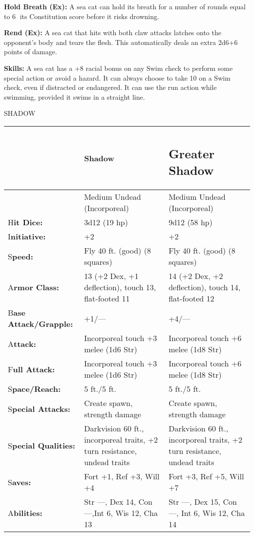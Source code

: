 \documentclass{article}
\begin{document}
\textbf{Hold Breath (Ex): }A sea cat can hold its breath for a number of rounds 
equal to 6 $ $its Constitution score before it risks drowning. 

\textbf{Rend (Ex): }A sea cat that hits with both claw attacks latches onto the 
opponent's body and tears the flesh. This automatically deals an extra 2d6+6 points 
of damage.

\textbf{Skills:} A sea cat has a +8 racial bonus on any Swim check to perform some 
special action or avoid a hazard. It can always choose to take 10 on a Swim check, 
even if distracted or endangered. It can use the run action while swimming, provided 
it swims in a straight line.

\vspace{12pt}
{\LARGE{}SHADOW}

\begin{tabular}{|>{\raggedright}p{47pt}|>{\raggedright}p{135pt}|>{\raggedright}p{132pt}|}
\hline
 & S\textbf{hadow} & \subsection*{G\textbf{reater Shadow}}\tabularnewline
\hline
 & Medium Undead (Incorporeal) & Medium Undead (Incorporeal)\tabularnewline
\hline
H\textbf{it Dice:} & 3d12 (19 hp) & 9d12 (58 hp)\tabularnewline
\hline
I\textbf{nitiative:} & +2 & +2\tabularnewline
\hline
S\textbf{peed:} & Fly 40 ft. (good) (8 squares) & Fly 40 ft. (good) (8 squares)\tabularnewline
\hline
A\textbf{rmor Class:} & 13 (+2 Dex, +1 deflection), touch 13, flat-footed 11 & 14 
(+2 Dex, +2 deflection), touch 14, flat-footed 12 \tabularnewline
\hline
B\textbf{ase Attack/Grapple:} & +1/--- & +4/---\tabularnewline
\hline
A\textbf{ttack:} & Incorporeal touch +3 melee (1d6 Str) & Incorporeal touch +6 
melee (1d8 Str)\tabularnewline
\hline
F\textbf{ull Attack:} & Incorporeal touch +3 melee (1d6 Str) & Incorporeal touch 
+6 melee (1d8 Str)\tabularnewline
\hline
S\textbf{pace/Reach:} & 5 ft./5 ft.  & 5 ft./5 ft.\tabularnewline
\hline
S\textbf{pecial Attacks:} & Create spawn, strength damage  & Create spawn, strength 
damage\tabularnewline
\hline
S\textbf{pecial Qualities:} & Darkvision 60 ft., incorporeal traits, +2 turn resistance, 
undead traits  & Darkvision 60 ft., incorporeal traits, +2 turn resistance, undead 
traits\tabularnewline
\hline
S\textbf{aves:} & Fort +1, Ref +3, Will +4  & Fort +3, Ref +5, Will +7\tabularnewline
\hline
A\textbf{bilities:} & Str ---, Dex 14, Con ---,Int 6, Wis 12, Cha 13  & Str ---, 
Dex 15, Con ---, Int 6, Wis 12, Cha 14\tabularnewline

\end{tabular}
\end{document}
